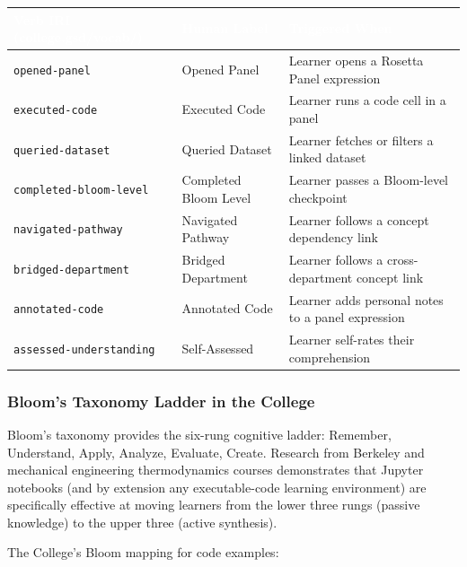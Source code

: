 \documentclass[11pt,letterpaper]{article}
\newcommand{\tableheader}[1]{\textbf{\sffamily\textcolor{white}{#1}}}
\begin{document}
\begin{center}
\begin{tabularx}{\textwidth}{L{3.5cm}L{4cm}X}
\toprule
{}
\tableheader{Verb IRI (college.gsd/vocab/)} & \tableheader{Human Label} & \tableheader{Triggered When} \\
\midrule
\texttt{opened-panel} & Opened Panel & Learner opens a Rosetta Panel expression \\
\texttt{executed-code} & Executed Code & Learner runs a code cell in a panel \\
\texttt{queried-dataset} & Queried Dataset & Learner fetches or filters a linked dataset \\
\texttt{completed-bloom-level} & Completed Bloom Level & Learner passes a Bloom-level checkpoint \\
\texttt{navigated-pathway} & Navigated Pathway & Learner follows a concept dependency link \\
\texttt{bridged-department} & Bridged Department & Learner follows a cross-department concept link \\
\texttt{annotated-code} & Annotated Code & Learner adds personal notes to a panel expression \\
\texttt{assessed-understanding} & Self-Assessed & Learner self-rates their comprehension \\
\bottomrule
\end{tabularx}
\end{center}

\subsubsection{Bloom's Taxonomy Ladder in the College}

Bloom's taxonomy provides the six-rung cognitive ladder: Remember, Understand, Apply, Analyze, Evaluate, Create. Research from Berkeley and mechanical engineering thermodynamics courses demonstrates that Jupyter notebooks (and by extension any executable-code learning environment) are specifically effective at moving learners from the lower three rungs (passive knowledge) to the upper three (active synthesis).

The College's Bloom mapping for code examples:
\end{document}
